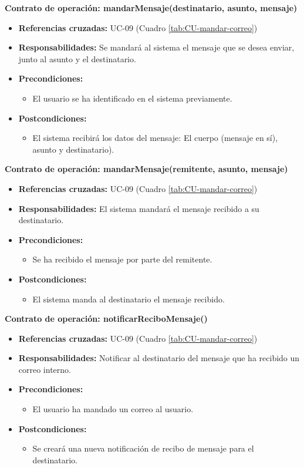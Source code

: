 \textbf{Contrato de operación: mandarMensaje(destinatario, asunto, mensaje)}
\begin{itemize}
\item \textbf{Referencias cruzadas:} UC-09 (Cuadro \ref{tab:CU-mandar-correo})
\item \textbf{Responsabilidades:} Se mandará al sistema el mensaje que se desea enviar, junto al asunto y el destinatario.
\item \textbf{Precondiciones:} 
 \begin{itemize}
\item El usuario se ha identificado en el sistema previamente.
\end {itemize}
\item \textbf{Postcondiciones:} 
 \begin{itemize}
\item El sistema recibirá los datos del mensaje: El cuerpo (mensaje en sí), asunto y destinatario).
\end {itemize}
\end {itemize}

\textbf{Contrato de operación: mandarMensaje(remitente, asunto, mensaje)}
\begin{itemize}
\item \textbf{Referencias cruzadas:} UC-09 (Cuadro \ref{tab:CU-mandar-correo})
\item \textbf{Responsabilidades:} El sistema mandará el mensaje recibido a su destinatario.
\item \textbf{Precondiciones:} 
 \begin{itemize}
\item Se ha recibido el mensaje por parte del remitente.
\end {itemize}
\item \textbf{Postcondiciones:} 
 \begin{itemize}
\item El sistema manda al destinatario el mensaje recibido.
\end {itemize}
\end {itemize}

\textbf{Contrato de operación: notificarReciboMensaje()}
\begin{itemize}
\item \textbf{Referencias cruzadas:} UC-09 (Cuadro \ref{tab:CU-mandar-correo})
\item \textbf{Responsabilidades:} Notificar al destinatario del mensaje que ha recibido un correo interno.
\item \textbf{Precondiciones:} 
 \begin{itemize}
\item El usuario ha mandado un correo al usuario.
\end {itemize}
\item \textbf{Postcondiciones:} 
 \begin{itemize}
\item Se creará una nueva notificación de recibo de mensaje para el destinatario.
\end {itemize}
\end {itemize}


